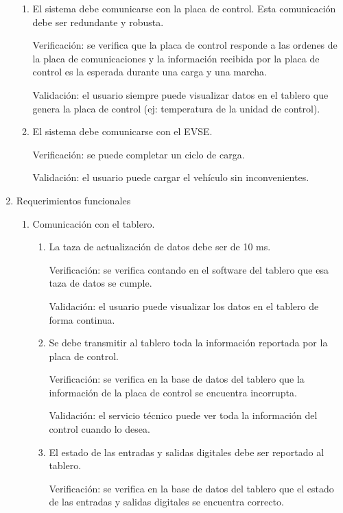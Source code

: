 \documentclass[
11pt, %
codirector, %
]{charter}
\begin{document}
\begin{enumerate}
\begin{enumerate}
		      \item El sistema debe comunicarse con la placa de control. Esta comunicación debe ser redundante y robusta.

		            Verificación: se verifica que la placa de control responde a las ordenes de la placa de comunicaciones y la información recibida por la placa de control es la esperada durante una carga y una marcha.

		            Validación: el usuario siempre puede visualizar datos en el tablero que genera la placa de control (ej: temperatura de la unidad de control).
		      \item El sistema debe comunicarse con el EVSE.

		            Verificación: se puede completar un ciclo de carga.

		            Validación: el usuario puede cargar el vehículo sin inconvenientes.

	      \end{enumerate}
	\item Requerimientos funcionales
	      \begin{enumerate}
		      \item Comunicación con el tablero.
		            \begin{enumerate}
			            \item La taza de actualización de datos debe ser de 10 ms.

			                  Verificación: se verifica contando en el software del tablero que esa taza de datos se cumple.

			                  Validación: el usuario puede visualizar los datos en el tablero de forma continua.

			            \item Se debe transmitir al tablero toda la información reportada por la placa de control.

			                  Verificación: se verifica en la base de datos del tablero que la información de la placa de control se encuentra incorrupta.

			                  Validación: el servicio técnico puede ver toda la información del control cuando lo desea.

			            \item El estado de las entradas y salidas digitales debe ser reportado al tablero.

			                  Verificación: se verifica en la base de datos del tablero que el estado de las entradas y salidas digitales se encuentra correcto.


\end{enumerate}
\end{enumerate}
\end{enumerate}
\end{document}
